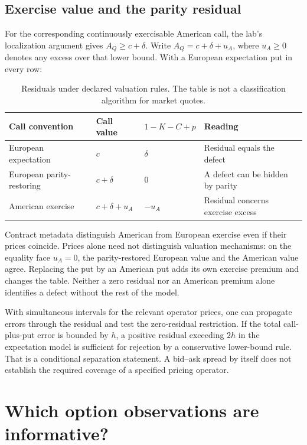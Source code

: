 \subsection{Exercise value and the parity residual}
For the corresponding continuously exercisable American call, the lab's
localization argument gives $A_Q\geq c+\delta$. Write
$A_Q=c+\delta+u_A$, where $u_A\geq0$ denotes any excess over that lower
bound. With a European expectation put in every row:
\begin{table}[htbp]\centering\small
\begin{tabularx}{\linewidth}{@{}YllY@{}}\toprule
Call convention & Call value & $1-K-C+p$ & Reading\\
\midrule
European expectation & $c$ & $\delta$ & Residual equals the defect\\
European parity-restoring & $c+\delta$ & $0$ & A defect can be hidden by parity\\
American exercise & $c+\delta+u_A$ & $-u_A$ & Residual concerns exercise excess\\
\bottomrule\end{tabularx}
\caption{Residuals under declared valuation rules. The table is not a
classification algorithm for market quotes.}\label{tab:operators}
\end{table}

Contract metadata distinguish American from European exercise even if their
prices coincide. Prices alone need not distinguish valuation mechanisms:
on the equality face $u_A=0$, the parity-restored European value and the
American value agree. Replacing the put by an American put adds its own
exercise premium and changes the table. Neither a zero residual nor an
American premium alone identifies a defect without the rest of the model.

With simultaneous intervals for the relevant operator prices, one can
propagate errors through the residual and test the zero-residual
restriction. If the total call-plus-put error is bounded by $h$, a
positive residual exceeding $2h$ in the expectation model is sufficient
for rejection by a conservative lower-bound rule. That is a conditional
separation statement. A bid--ask spread by itself does not establish the
required coverage of a specified pricing operator.

\section{Which option observations are informative?}\label{sec:optioninfo}
